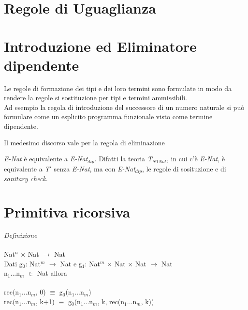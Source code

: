\section{Regole di Uguaglianza}
\label{subsec: uguaglianza-nat}
\normalsize
\begin{center}
\begin{prooftree}
\end{prooftree}
\end{center}

\section{Introduzione ed Eliminatore dipendente}
\label{subsec:introduzione-eliminatore dipendente-naturale}
Le regole di formazione dei tipi e dei loro termini sono formulate in modo da rendere la regole si sostituzione per tipi e termini ammissibili.\\
Ad esempio la regola di introduzione del successore di un numero naturale si pu\`o formulare come un esplicito programma funzionale visto come termine dipendente.
\begin{prooftree}
\end{prooftree}
Il medesimo discorso vale per la regola di eliminazione
\begin{prooftree}
\end{prooftree}
\noindent
\textit{E-Nat} \`e equivalente a \textit{E-Nat$_{dip}$}. Difatti la teoria \textit{T$_{N1Nat}$}, in cui c'\`e \textit{E-Nat}, \`e equivalente a \textit{T$\backprime$} senza \textit{E-Nat}, ma con \textit{E-Nat$_{dip}$}, le regole di sosituzione e di \textit{sanitary check}.

\section{Primitiva ricorsiva}
\label{subsec: primitiva-ricorsiva}
\textit{Definizione}\\\\
Nat$^n$ $\times$ Nat $\rightarrow$ Nat\\
Dati g$_0$: Nat$^m$ $\rightarrow$ Nat e g$_1$: Nat$^m$ $\times$ Nat $\times$ Nat $\rightarrow$ Nat\\
n$_1$...n$_m$ $\in$ Nat allora\\\\
rec(n$_1$...n$_m$, 0) $\equiv$ g$_0$(n$_1$...n$_m$)\\
rec(n$_1$...n$_m$, k+1) $\equiv$ g$_0$(n$_1$...n$_m$, k, rec(n$_1$...n$_m$, k))


